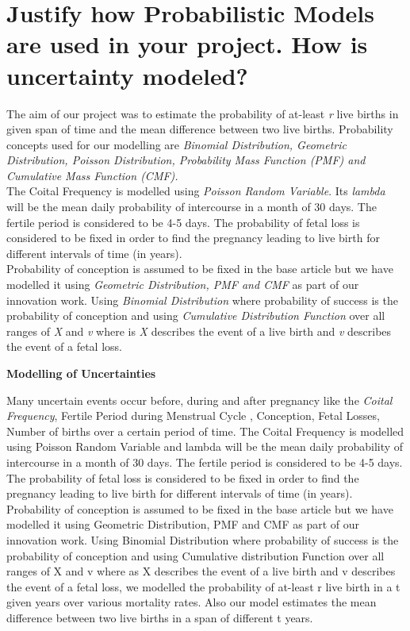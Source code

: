 \documentclass{article}
\begin{document}
\section {Justify how Probabilistic Models are used in your project. How is uncertainty modeled?}
{The aim of our project was to estimate the probability of at-least {\slshape r} live births in given span of time and the mean difference between two live births. Probability concepts used for our modelling are {\slshape Binomial Distribution, Geometric Distribution, Poisson Distribution, Probability Mass Function (PMF) and Cumulative Mass Function (CMF).}\\

The Coital Frequency is modelled using {\slshape Poisson Random Variable}. Its {\slshape lambda} will be the mean daily probability of intercourse in a month of 30 days. The fertile period is considered to be 4-5 days. The probability of fetal loss is considered to be fixed in order to find the pregnancy leading to live birth for different intervals of time (in years). \\

Probability of conception is assumed to be fixed in the base article but we have modelled it using {\slshape Geometric Distribution, PMF and CMF} as part of our innovation work. Using {\slshape Binomial Distribution} where probability of success is the probability of conception and using {\slshape Cumulative Distribution Function} over all ranges of {\slshape X} and {\slshape v} where is {\slshape X} describes the event of a live birth and {\slshape v} describes the event of a fetal loss.}
\begin{center}
	{\large {\bfseries Modelling of Uncertainties}}
\end{center}
Many uncertain events occur before, during and after pregnancy like the {\slshape Coital Frequency}, Fertile Period during Menstrual Cycle , Conception, Fetal Losses, Number of births over a certain period of time.
The Coital Frequency is modelled using Poisson Random Variable and lambda will be the mean daily probability of intercourse in a month of 30 days. The fertile period is considered to be 4-5 days. The probability of fetal loss is considered to be fixed in order to find the pregnancy leading to live birth for different intervals of time (in years). 
Probability of conception is assumed to be fixed in the base article but we have modelled it using Geometric Distribution, PMF and CMF as part of our innovation work. Using Binomial Distribution where probability of success is the probability of conception and using Cumulative distribution Function over all ranges of X and v where as X describes the event of a live birth and v describes the event of a fetal loss, we modelled the probability of at-least r live birth in a t given years over various mortality rates. Also our model estimates the mean difference between two live births in a span of different t years.
\end{document}
